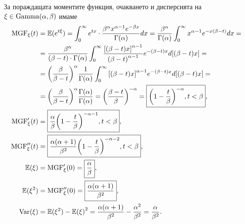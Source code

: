 \documentclass[numbers=endperiod, DIV=15, bibliography=totocnumbered]{scrartcl}
\begin{document}
За пораждащата моментите функция, очакването и дисперсията на $\xi \in \operatorname{Gamma}(\alpha, \beta)$ имаме
\begingroup
\allowdisplaybreaks
\begin{align*}
  \operatorname{MGF}_\xi(t)
  &=
  \mathbb{E}(e^{t\xi})
  =
  \int_0^\infty e^{tx} \cdot \frac {\beta^\alpha x^{\alpha-1} e^{-\beta x}} {\Gamma(\alpha)} dx
  =
  \frac {\beta^\alpha} {\Gamma(\alpha)} \int_0^\infty x^{\alpha-1} e^{-x(\beta-t)} dx
  = \\ &=
  \frac {\beta^\alpha} {(\beta-t) \cdot \Gamma(\alpha)} \int_0^\infty \frac {{[(\beta-t)x]}^{\alpha-1}} {{(\beta-t)}^{\alpha-1}} e^{-(\beta-t)x} d[(\beta-t)x]
  = \\ &=
  {\left(\frac \beta {\beta-t} \right)}^\alpha \frac 1 {\Gamma(\alpha)} \int_0^\infty {[(\beta-t)x]}^{\alpha-1} e^{-(\beta-t)x} d[(\beta-t)x]
  = \\ &=
  {\left(\frac \beta {\beta-t} \right)}^\alpha \frac {\Gamma(\alpha)} {\Gamma(\alpha)}
  =
  {\left(\frac {\beta-t} \beta \right)}^{-\alpha}
  =
  \boxed{{\left(1 - \frac t \beta \right)}^{-\alpha}, t < \beta},
  \\
  \operatorname{MGF}'_\xi(t)
  &=
  \boxed{\frac \alpha \beta {\left(1 - \frac t \beta \right)}^{-\alpha-1}, t < \beta},
  \\
  \operatorname{MGF}''_\xi(t)
  &=
  \boxed{\frac {\alpha(\alpha+1)} {\beta^2} {\left(1 - \frac t \beta \right)}^{-\alpha-2}, t < \beta},
  \\
  \mathbb{E}(\xi)
  &=
  \operatorname{MGF}'_\xi(0)
  =
  \boxed{\frac \alpha \beta},
  \\
  \mathbb{E}(\xi^2)
  &=
  \operatorname{MGF}''_\xi(0)
  =
  \boxed{\frac {\alpha(\alpha+1)} {\beta^2}},
  \\
  \operatorname{Var}(\xi)
  &=
  \mathbb{E}(\xi^2) - {\mathbb{E}(\xi)}^2
  =
  \frac {\alpha(\alpha+1)} {\beta^2} - \frac {\alpha^2} {\beta^2}
  =
  \frac \alpha {\beta^2}.
\end{align*}
\endgroup
\end{document}
